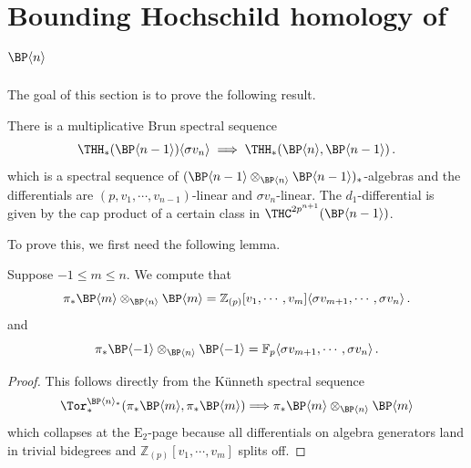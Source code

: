 \section{Bounding Hochschild homology of \texorpdfstring{$\BP\langle n\rangle$}{BP n }}\label{sec:bounding}
The goal of this section is to prove the following result.  
\begin{proposition}\label{prop:brunss}
There is a multiplicative Brun spectral sequence 
\begin{equation}\label{BrunSS}
\THH_*(\BP\langle n-1 \rangle)\langle \sigma v_{n}\rangle \implies \THH_*(\BP\langle n\rangle,\BP\langle n-1\rangle)\,.
\end{equation}
which is a spectral sequence of $(\BP\langle n-1 \rangle\otimes_{\BP\langle n\rangle}\BP\langle n-1 \rangle)_*$-algebras and the differentials are $(p,v_1,\cdots ,v_{n-1})$-linear and $\sigma v_{n}$-linear. The $d_1$-differential is given by the cap product of a certain class in $\THC^{2p^{n+1}}(\BP\langle n-1\rangle)$.  
\end{proposition}

To prove this, we first need the following lemma. 
\begin{lemma}\label{lem:BPn-rel-cooperations}
Suppose $-1\le m\le n$. We compute that 
\[\pi_*\BP\langle m \rangle\otimes_{\BP\langle n\rangle}\BP\langle m \rangle=\mathbb{Z}_{(p)}[v_1,\cdots ,v_{m}]\langle \sigma v_{m+1} , \cdots ,\sigma v_{n} \rangle \,. \]
and 
\[
\pi_*\BP\langle -1 \rangle\otimes_{\BP\langle n\rangle}\BP\langle -1\rangle=\mathbb{F}_p\langle \sigma v_{m+1} , \cdots ,\sigma v_{n} \rangle \,. 
\]
\end{lemma}
\begin{proof}
This follows directly from the K\"unneth spectral sequence
\[ 
\Tor_*^{\BP\langle n\rangle_*}(\pi_*\BP\langle m\rangle,\pi_*\BP\langle m\rangle)\Longrightarrow \pi_*\BP\langle m\rangle\otimes_{\BP\langle n\rangle}\BP\langle m\rangle
\]
which collapses at the $\mathrm{E}_2$-page because all differentials on algebra generators land in trivial bidegrees and $\mathbb{Z}_{(p)}[v_1,\cdots ,v_{m}]$ splits off. 
\end{proof}

